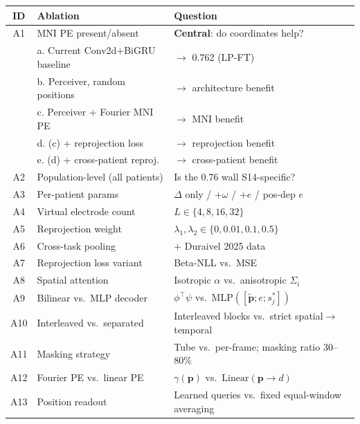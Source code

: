 \documentclass[11pt,letterpaper]{article}
\newcommand{\bfp}{\mathbf{p}}
\begin{document}
\begin{table}[ht!]\centering\small
\begin{tabular}{@{}clp{6.8cm}@{}}
\toprule
\textbf{ID} & \textbf{Ablation} & \textbf{Question} \\
\midrule
A1 & MNI PE present/absent & \textbf{Central}: do coordinates help? \\
 & \quad a. Current Conv2d+BiGRU baseline & $\to$ 0.762 (LP-FT) \\
 & \quad b. Perceiver, random positions & $\to$ architecture benefit \\
 & \quad c. Perceiver + Fourier MNI PE & $\to$ MNI benefit \\
 & \quad d. (c) + reprojection loss & $\to$ reprojection benefit \\
 & \quad e. (d) + cross-patient reproj.\ & $\to$ cross-patient benefit \\
\midrule
A2 & Population-level (all patients) & Is the 0.76 wall S14-specific? \\
A3 & Per-patient params & $\Delta$ only / $+\omega$ / $+e$ / pos-dep $e$ \\
A4 & Virtual electrode count & $L \in \{4, 8, 16, 32\}$ \\
A5 & Reprojection weight & $\lambda_1, \lambda_2 \in \{0, 0.01, 0.1, 0.5\}$ \\
A6 & Cross-task pooling & $+$ Duraivel 2025 data \\
A7 & Reprojection loss variant & Beta-NLL vs.\ MSE \\
A8 & Spatial attention & Isotropic $\alpha$ vs.\ anisotropic $\Sigma_i$ \\
A9 & Bilinear vs.\ MLP decoder & $\phi^\top\psi$ vs.\ MLP$([\tilde{\bfp}; e; s_j^*])$ \\
A10 & Interleaved vs.\ separated & Interleaved blocks vs.\ strict spatial$\to$temporal \\
A11 & Masking strategy & Tube vs.\ per-frame; masking ratio 30--80\% \\
A12 & Fourier PE vs.\ linear PE & $\gamma(\bfp)$ vs.\ $\text{Linear}(\bfp \to d)$ \\
A13 & Position readout & Learned queries vs.\ fixed equal-window averaging \\
\bottomrule
\end{tabular}
\end{table}


\end{document}
